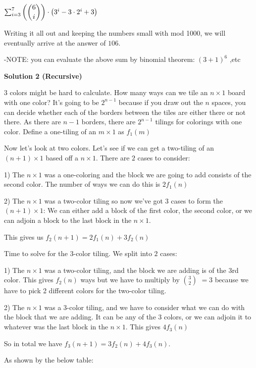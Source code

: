 \begin{enumerate}
 $\sum_{i=3}^{7} \left(\dbinom{6}{i}\right)\cdot\left(3^i-3\cdot2^i+3\right)$

 Writing it all out and keeping the numbers small with mod 1000, we will eventually arrive at the answer of $\boxed{106}$.

 -NOTE: you can evaluate the above sum by binomial theorem: $(3+1)^6$ ,etc

 



\textbf{Solution 2 (Recursive)}

3 colors might be hard to calculate. How many ways can we tile an $n \times 1$ board with one color? It's going to be $2^{n-1}$ because if you draw out the $n$ spaces, you can decide whether each of the borders between the tiles are either there or not there. As there are $n-1$ borders, there are $2^{n-1}$ tilings for colorings with one color. Define a one-tiling of an $m \times 1$ as $f_1(m)$

 Now let's look at two colors. Let's see if we can get a two-tiling of an $(n+1) \times 1$ based off a $n \times 1$. There are $2$ cases to consider:

 1) The $n \times 1$ was a one-coloring and the block we are going to add consists of the second color. The number of ways we can do this is $2f_1(n)$

 2) The $n \times 1$ was a two-color tiling so now we've got $3$ cases to form the $(n+1) \times 1$: We can either add a block of the first color, the second color, or we can adjoin a block to the last block in the $n \times 1$. 

 This gives us $f_2(n+1)=2f_1(n)+3f_2(n)$

 Time to solve for the $3$-color tiling. We split into $2$ cases:

 1) The $n \times 1$ was a two-color tiling, and the block we are adding is of the 3rd color. This gives $f_2(n)$ ways but we have to multiply by $3 \choose 2$ $= 3$ because we have to pick 2 different colors for the two-color tiling. 

 2) The $n \times 1$ was a 3-color tiling, and we have to consider what we can do with the block that we are adding. It can be any of the 3 colors, or we can adjoin it to whatever was the last block in the $n \times 1$. This gives $4f_3(n)$

 So in total we have $f_3(n+1)=3f_2(n)+4f_3(n)$. 

 As shown by the below table:

 



\end{enumerate}

